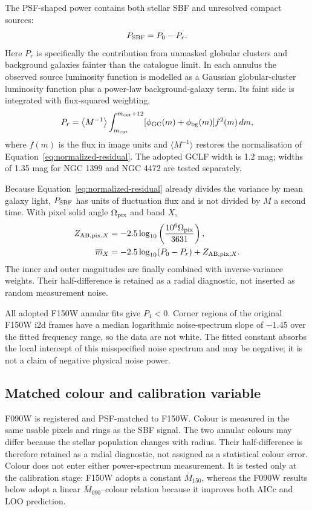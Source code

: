\documentclass[nodoi,nocopyright]{pas}
\newcommand{\mbar}{\overline{m}}
\newcommand{\Mbar}{\overline{M}}
\begin{document}
The PSF-shaped power contains both stellar SBF and unresolved compact sources:
\begin{equation}
 P_{\rm SBF}=P_0-P_r.
 \label{eq:pr-subtraction}
\end{equation}
Here $P_r$ is specifically the contribution from unmasked globular clusters
and background galaxies fainter than the catalogue limit. In each annulus the
observed source luminosity function is modelled as a Gaussian globular-cluster
luminosity function plus a power-law background-galaxy term. Its faint side is
integrated with flux-squared weighting,
\begin{equation}
 P_r=\left\langle M^{-1}\right\rangle
 \int_{m_{\rm cut}}^{m_{\rm cut}+12}
 [\phi_{\rm GC}(m)+\phi_{\rm bg}(m)]f^2(m)\,dm,
\end{equation}
where $f(m)$ is the flux in image units and $\langle M^{-1}\rangle$ restores
the normalisation of Equation~\ref{eq:normalized-residual}. The adopted GCLF width
is 1.2 mag; widths of 1.35 mag for NGC 1399 and NGC 4472 are tested separately.

Because Equation~\ref{eq:normalized-residual} already divides the variance by mean
galaxy light, $P_{\rm SBF}$ has units of fluctuation flux and is not divided by
$M$ a second time. With pixel solid angle $\Omega_{\rm pix}$ and band $X$,
\begin{align}
 Z_{{\rm AB,pix},X}&=-2.5\log_{10}\left(\frac{10^6\Omega_{\rm pix}}{3631}\right),\\
 \mbar_X&=-2.5\log_{10}(P_0-P_r)+Z_{{\rm AB,pix},X}.
 \label{eq:mbar-from-power}
\end{align}
The inner and outer magnitudes are finally combined with inverse-variance
weights. Their half-difference is retained as a radial diagnostic, not inserted
as random measurement noise.

All adopted F150W annular fits give $P_1<0$. Corner regions of the original F150W
i2d frames have a median logarithmic noise-spectrum slope of $-1.45$ over the
fitted frequency range, so the data are not white. The fitted constant absorbs
the local intercept of this misspecified noise spectrum and may be negative;
it is not a claim of negative physical noise power.

\subsection{Matched colour and calibration variable}

F090W is registered and PSF-matched to F150W. Colour is measured in the same
usable pixels and rings as the SBF signal. The two annular colours may differ
because the stellar population changes with radius. Their half-difference is
therefore retained as a radial diagnostic, not assigned as a statistical
colour error. Colour does not enter either power-spectrum measurement.  It is
tested only at the calibration stage: F150W adopts a constant $\Mbar_{150}$,
whereas the F090W results below adopt a linear $\Mbar_{090}$--colour relation
because it improves both AICc and LOO prediction.
\end{document}
